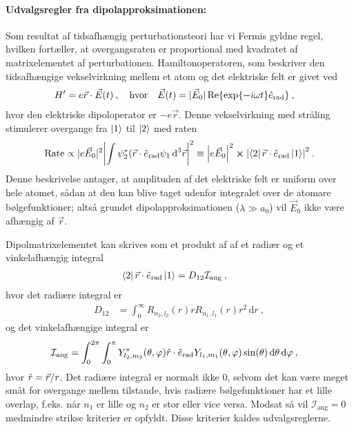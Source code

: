 \paragraph{Udvalgsregler fra dipolapproksimationen:} Som resultat af tidsafhængig perturbationsteori har vi Fermis gyldne regel, hvilken fortæller, at overgangsraten er proportional med kvadratet af matrixelementet af perturbationen. Hamiltonoperatoren, som beskriver den tidsafhængige vekselvirkning mellem et atom og det elektriske felt er givet ved
\begin{align}
    H' &= e\Vec{r} \cdot \Vec{E}(t) \: , \quad \text{hvor} \quad \Vec{E}(t) = |\Vec{E}_0|\Re{\exp{-i\omega t}\Hat{e}_\text{rad}} \: ,
\end{align}
hvor den elektriske dipoloperator er $-e\Vec{r}$. Denne vekselvirkning med stråling stimulerer overgange fra $\ket{1}$ til $\ket{2}$ med raten
\begin{align}
    \text{Rate} \propto |e\Vec{E}_0|^2 \abs{\int \psi_2^* (\Vec{r} \cdot \Hat{e}_\text{rad} \psi_1 \, \text{d}^3\Vec{r}}^2 \equiv \abs{e\Vec{E}_0}^2 \cross \abs{\bra{2}\Vec{r}\cdot\Hat{e}_\text{rad}\ket{1}}^2 \: .
\end{align}
Denne beskrivelse antager, at amplituden af det elektriske felt er uniform over hele atomet, sådan at den kan blive taget udenfor integralet over de atomare bølgefunktioner; altså grundet \textsf{dipolapproksimationen} ($\lambda \gg a_0$) vil $\Vec{E}_0$ ikke være afhængig af $\Vec{r}$.

Dipolmatrixelementet kan skrives som et produkt af af et radiær og et vinkelafhængig integral
\begin{align}
    \bra{2}\Vec{r}\cdot\Hat{e}_\text{rad}\ket{1} &= D_{12}\mathcal{I}_\text{ang} \: ,
\end{align}
hvor det radiære integral er
\begin{align}
    D_{12} &= \int_0^\infty R_{n_2,l_2}(r) r R_{n_1,l_1}(r) r^2 \, \text{d}r \: ,
\end{align}
og det vinkelafhængige integral er
\begin{align} \label{eq:Q07_AngularIntegral}
    \mathcal{I}_\text{ang} &= \int_0^{2\pi}\int_0^\pi Y_{l_2,m_2}^*(\theta,\phi) \Hat{r} \cdot \Hat{e}_\text{rad} Y_{l_1,m_1}(\theta,\phi) \sin(\theta) \, \text{d}\theta \, \text{d}\phi \: ,
\end{align}
hvor $\Hat{r} = \Vec{r}/r$.
Det radiære integral er normalt ikke 0, selvom det kan være meget småt for overgange mellem tilstande, hvis radiære bølgefunktioner har et lille overlap, f.eks. når $n_1$ er lille og $n_2$ er stor eller vice versa. Modsat så vil $\mathcal{I}_\text{ang} = 0$ medmindre strikse kriterier er opfyldt. Disse kriterier kaldes udvalgsreglerne.\\

